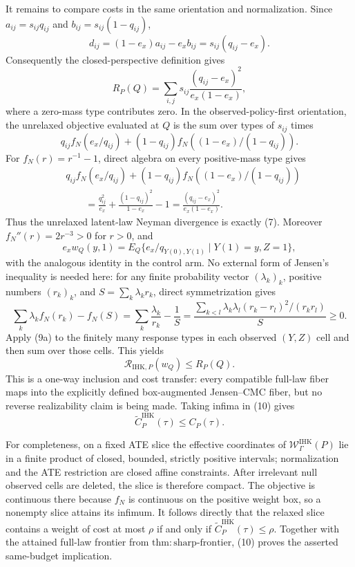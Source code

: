 It remains to compare costs in the same orientation and normalization.  Since \(a_{ij}=s_{ij}q_{ij}\) and \(b_{ij}=s_{ij}(1-q_{ij})\),
\[
 d_{ij}=(1-e_x)a_{ij}-e_xb_{ij}=s_{ij}(q_{ij}-e_x). \tag{6}
\]
Consequently the closed-perspective definition gives
\[
 R_P(Q)=\sum_{i,j}s_{ij}\frac{(q_{ij}-e_x)^2}{e_x(1-e_x)}, \tag{7}
\]
where a zero-mass type contributes zero.  In the observed-policy-first orientation, the unrelaxed objective evaluated at \(Q\) is the sum over types of \(s_{ij}\) times
\[
 q_{ij}f_N(e_x/q_{ij})+(1-q_{ij})f_N((1-e_x)/(1-q_{ij})).
\]
For \(f_N(r)=r^{-1}-1\), direct algebra on every positive-mass type gives
\[
 \begin{aligned}
 &q_{ij}f_N(e_x/q_{ij})+(1-q_{ij})f_N((1-e_x)/(1-q_{ij}))\\
 &\qquad=\frac{q_{ij}^2}{e_x}+\frac{(1-q_{ij})^2}{1-e_x}-1
 =\frac{(q_{ij}-e_x)^2}{e_x(1-e_x)}.
 \end{aligned} \tag{8}
\]
Thus the unrelaxed latent-law Neyman divergence is exactly (7).  Moreover \(f_N''(r)=2r^{-3}>0\) for \(r>0\), and
\[
 e_xw_Q(y,1)=E_Q\{e_x/q_{Y(0),Y(1)}\mid Y(1)=y,Z=1\}, \tag{9}
\]
with the analogous identity in the control arm.  No external form of Jensen's inequality is needed here: for any finite probability vector \((\lambda_k)_k\), positive numbers \((r_k)_k\), and \(S=\sum_k\lambda_kr_k\), direct symmetrization gives
\[
 \sum_k\lambda_k f_N(r_k)-f_N(S)
 =\sum_k\frac{\lambda_k}{r_k}-\frac1S
 =\frac{\sum_{k<l}\lambda_k\lambda_l(r_k-r_l)^2/(r_kr_l)}{S}\geq0. \tag{9a}
\]
Apply (9a) to the finitely many response types in each observed \((Y,Z)\) cell and then sum over those cells.  This yields
\[
 \mathscr R_{\mathrm{IHK},P}(w_Q)\leq R_P(Q). \tag{10}
\]
This is a one-way inclusion and cost transfer: every compatible full-law fiber maps into the explicitly defined box-augmented Jensen--CMC fiber, but no reverse realizability claim is being made.  Taking infima in (10) gives
\[
 \widetilde C^{\mathrm{IHK}}_P(\tau)\leq C_P(\tau). \tag{11}
\]

For completeness, on a fixed ATE slice the effective coordinates of \(\mathcal W^{\mathrm{IHK}}_\Gamma(P)\) lie in a finite product of closed, bounded, strictly positive intervals; normalization and the ATE restriction are closed affine constraints.  After irrelevant null observed cells are deleted, the slice is therefore compact.  The objective is continuous there because \(f_N\) is continuous on the positive weight box, so a nonempty slice attains its infimum.  It follows directly that the relaxed slice contains a weight of cost at most \(\rho\) if and only if \(\widetilde C^{\mathrm{IHK}}_P(\tau)\leq\rho\).  Together with the attained full-law frontier from \(\mathrm{thm{:}sharp\mbox{-}frontier}\), (10) proves the asserted same-budget implication.

